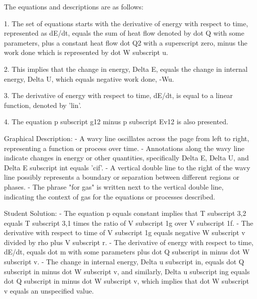 The equations and descriptions are as follows:

1. The set of equations starts with the derivative of energy with respect to time, represented as dE/dt, equals the sum of heat flow denoted by dot Q with some parameters, plus a constant heat flow dot Q2 with a superscript zero, minus the work done which is represented by dot W subscript u.

2. This implies that the change in energy, Delta E, equals the change in internal energy, Delta U, which equals negative work done, -Wu.

3. The derivative of energy with respect to time, dE/dt, is equal to a linear function, denoted by 'lin'.

4. The equation p subscript g12 minus p subscript Ev12 is also presented.

Graphical Description:
- A wavy line oscillates across the page from left to right, representing a function or process over time.
- Annotations along the wavy line indicate changes in energy or other quantities, specifically Delta E, Delta U, and Delta E subscript int equals 'cif'.
- A vertical double line to the right of the wavy line possibly represents a boundary or separation between different regions or phases.
- The phrase "for gas" is written next to the vertical double line, indicating the context of gas for the equations or processes described.

Student Solution:
- The equation p equals constant implies that T subscript 3,2 equals T subscript 3,1 times the ratio of V subscript 1g over V subscript 1f.
- The derivative with respect to time of V subscript 1g equals negative W subscript v divided by rho plus V subscript r.
- The derivative of energy with respect to time, dE/dt, equals dot m with some parameters plus dot Q subscript in minus dot W subscript v.
- The change in internal energy, Delta u subscript in, equals dot Q subscript in minus dot W subscript v, and similarly, Delta u subscript ing equals dot Q subscript in minus dot W subscript v, which implies that dot W subscript v equals an unspecified value.